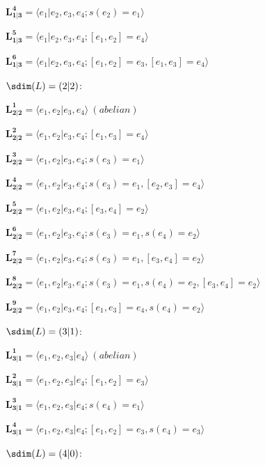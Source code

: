 \documentclass[12pt]{amsart}
\begin{document}
{$\mathbf{L^{4}_{1|3}} = \langle e_1|e_{2},e_{3},e_4; s(e_2)=e_1\rangle$

$\mathbf{L^{5}_{1|3}} = \langle e_{1}|e_{2},e_{3},e_4; [e_1,e_2]=e_4\rangle$

$\mathbf{L^{6}_{1|3}} = \langle e_{1}|e_{2},e_3,e_4; [e_1,e_2]=e_3, [e_1,e_3]=e_4\rangle$

\vspace{0.5 em}

\noindent\underline{$\sdim(L)=(2|2)$}:

$\mathbf{L^{1}_{2|2}} = \langle e_{1},e_{2}|e_3,e_4\rangle \ (abelian)$

            $\mathbf{L^{2}_{2|2}} = \langle e_{1},e_{2}|e_3,e_4; [e_1,e_3]=e_4\rangle$

            $\mathbf{L^{3}_{2|2}} = \langle e_{1},e_{2}|e_{3},e_4; s(e_{3}) = e_{1}\rangle$

            $\mathbf{L^{4}_{2|2}} = \langle e_{1},e_{2}|e_{3},e_4; s(e_{3}) = e_{1}, [e_2,e_3]=e_4\rangle$

            $\mathbf{L^{5}_{2|2}} = \langle e_{1},e_2|e_{3},e_{4}; [e_3,e_4]=e_2\rangle$

            $\mathbf{L^{6}_{2|2}} = \langle e_1,e_2|e_{3},e_{4}; s(e_3)=e_1, s(e_4)=e_2 \rangle$

            $\mathbf{L^{7}_{2|2}} = \langle e_1,e_2|e_{3},e_{4}; s(e_3)=e_1, [e_3,e_4]=e_2 \rangle$

            $\mathbf{L^{8}_{2|2}} = \langle e_1,e_2|e_{3},e_{4}; s(e_3)=e_1, s(e_4)=e_2, [e_3,e_4]=e_2 \rangle$

            $\mathbf{L^{9}_{2|2}} = \langle e_{1},e_2|e_{3},e_4; [e_1,e_3]=e_4, s(e_4)=e_2\rangle$

\vspace{0.5 em}

\noindent\underline{$\sdim(L)=(3|1)$}:

$\mathbf{L^{1}_{3|1}} = \langle e_{1},e_{2},e_3|e_4\rangle \ (abelian)$

            $\mathbf{L^{2}_{3|1}} = \langle e_{1},e_{2},e_3|e_4; [e_1,e_2]=e_3\rangle$

            $\mathbf{L^{3}_{3|1}} = \langle e_{1},e_{2},e_3|e_{4}; s(e_{4}) = e_{1}\rangle$

            $\mathbf{L^{4}_{3|1}} = \langle e_{1},e_{2},e_{3}|e_{4}; [e_1,e_2]=e_3, s(e_{4}) = e_{3}\rangle$

\vspace{0.5 em}

\noindent\underline{$\sdim(L)=(4|0)$}:

}
\end{document}
